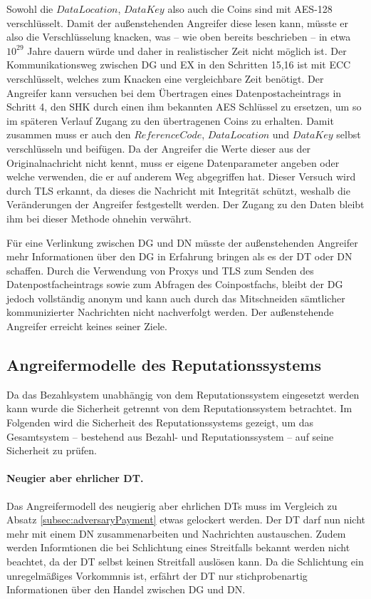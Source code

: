 \documentclass[
	fontsize=11pt,
	headings=small,
	parskip=half,           %
	bibliography=totoc,
	numbers=noenddot,       %
	open=any,               %
]{scrreprt}
\begin{document}
Sowohl die $DataLocation$, $DataKey$ also auch die Coins sind mit AES-128 verschlüsselt. Damit der außenstehenden Angreifer diese lesen kann, müsste er also die Verschlüsselung knacken, was -- wie oben bereits beschrieben -- in etwa $10^{29}$ Jahre dauern würde und daher in realistischer Zeit nicht möglich ist. Der Kommunikationsweg zwischen DG und EX in den Schritten 15,16 ist mit ECC verschlüsselt, welches zum Knacken eine vergleichbare Zeit benötigt. Der Angreifer kann versuchen bei dem Übertragen eines Datenpostacheintrags in Schritt 4, den SHK durch einen ihm bekannten AES Schlüssel zu ersetzen, um so im späteren Verlauf Zugang zu den übertragenen Coins zu erhalten. Damit zusammen muss er auch den $ReferenceCode$, $DataLocation$ und $DataKey$ selbst verschlüsseln und beifügen. Da der Angreifer die Werte dieser aus der Originalnachricht nicht kennt, muss er eigene Datenparameter angeben oder welche verwenden, die er auf anderem Weg abgegriffen hat. Dieser Versuch wird durch TLS erkannt, da dieses die Nachricht mit Integrität schützt, weshalb die Veränderungen der Angreifer festgestellt werden. Der Zugang zu den Daten bleibt ihm bei dieser Methode ohnehin verwährt. 

Für eine Verlinkung zwischen DG und DN müsste der außenstehenden Angreifer mehr Informationen über den DG in Erfahrung bringen als es der DT oder DN schaffen. Durch die Verwendung von Proxys und TLS zum Senden des Datenpostfacheintrags sowie zum Abfragen des Coinpostfachs, bleibt der DG jedoch vollständig anonym und kann auch durch das Mitschneiden sämtlicher kommunizierter Nachrichten nicht nachverfolgt werden. Der außenstehende Angreifer erreicht keines seiner Ziele.

\subsection{Angreifermodelle des Reputationssystems}
\label{subsec:adversaryRep}
Da das Bezahlsystem unabhängig von dem Reputationssystem eingesetzt werden kann wurde die Sicherheit getrennt von dem Reputationssystem betrachtet. Im Folgenden wird die Sicherheit des Reputationssystems gezeigt, um das Gesamtsystem -- bestehend aus Bezahl- und Reputationssystem -- auf seine Sicherheit zu prüfen.

\paragraph{Neugier aber ehrlicher DT.}
Das Angreifermodell des neugierig aber ehrlichen DTs muss im Vergleich zu Absatz \ref{subsec:adversaryPayment} etwas gelockert werden. Der DT darf nun nicht mehr mit einem DN zusammenarbeiten und Nachrichten austauschen. Zudem werden Informtionen die bei Schlichtung eines Streitfalls bekannt werden nicht beachtet, da der DT selbst keinen Streitfall auslösen kann. Da die Schlichtung ein unregelmäßiges Vorkommnis ist, erfährt der DT nur stichprobenartig Informationen über den Handel zwischen DG und DN. 
\end{document}

